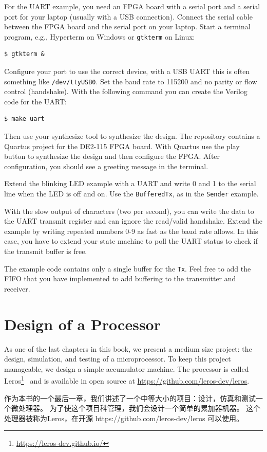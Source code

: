 \documentclass[%
    10pt,
    headinclude, footexclude,
    openright, %
    notitlepage,
    cleardoubleempty,
    headsepline,
    pointlessnumbers,
    bibtotoc, idxtotoc,
    ]{scrbook}
\newcommand{\code}[1]{{\small{\texttt{#1}}}}
\newcommand{\myref}[2]{\href{#1}{#2}}
\renewcommand{\myref}[2]{{#2}{\footnote{\url{#1}}}}
\begin{document}
For the UART example, you need an FPGA board with a serial port and
a serial port for your laptop (usually with a USB connection).
Connect the serial cable between the FPGA board and the serial port on
your laptop. Start a terminal program, e.g., Hyperterm on Windows
or \code{gtkterm} on Linux:
\begin{verbatim}
$ gtkterm &
\end{verbatim}
Configure your port to use the correct device, with a USB UART this
is often something like \code{/dev/ttyUSB0}. Set the baud rate to 115200
and no parity or flow control (handshake).
With the following command you can create the Verilog code for the UART:
\begin{verbatim}
$ make uart
\end{verbatim}
Then use your synthesize tool to synthesize the design.
The repository contains a Quartus project for the DE2-115 FPGA board.
With Quartus use the play button to synthesize the design and then configure
the FPGA.
After configuration, you should see a greeting message in the terminal.

Extend the blinking LED example with a UART and write 0 and 1 to the serial
line when the LED is off and on. Use the \code{BufferedTx}, as in the \code{Sender}
example.

With the slow output of characters (two per second), you can write the data
to the UART transmit register and can ignore the read/valid handshake.
Extend the example by writing repeated numbers 0-9 as fast as the baud rate allows.
In this case, you have to extend your state machine to poll the UART status
to check if the transmit buffer is free.

The example code contains only a single buffer for the \code{Tx}. Feel free to
add the FIFO that you have implemented to add buffering to the transmitter
and receiver. 

\chapter{Design of a Processor}

As one of the last chapters in this book, we present a medium size project:
the design, simulation, and testing of a microprocessor.
To keep this project manageable, we design a simple accumulator machine.
The processor is called \myref{https://leros-dev.github.io/}{Leros}~\cite{leros:arcs2019}
and is available in open source at \url{https://github.com/leros-dev/leros}.

作为本书的一个最后一章，我们讲述了一个中等大小的项目：设计，仿真和测试一个微处理器。
为了使这个项目科管理，我们会设计一个简单的累加器机器。
这个处理器被称为Leros，在开源 https://github.com/leros-dev/leros 可以使用。
\end{document}
